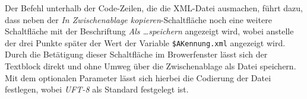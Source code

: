 Der Befehl  unterhalb der Code-Zeilen, die die XML-Datei ausmachen, führt dazu, dass neben der \emph{In Zwischenablage kopieren}-Schaltfläche noch eine weitere Schaltfläche mit der Beschriftung \emph{Als \dots speichern} angezeigt wird, wobei anstelle der drei Punkte später der Wert der Variable \verb|$AKennung.xml| angezeigt wird. Durch die Betätigung dieser Schaltfläche im Browerfenster lässt sich der Textblock direkt und ohne Umweg über die Zwischenablage als Datei speichern. Mit dem optionalen Parameter  lässt sich hierbei die Codierung der Datei festlegen, wobei \emph{UFT-8} als Standard festgelegt ist.

